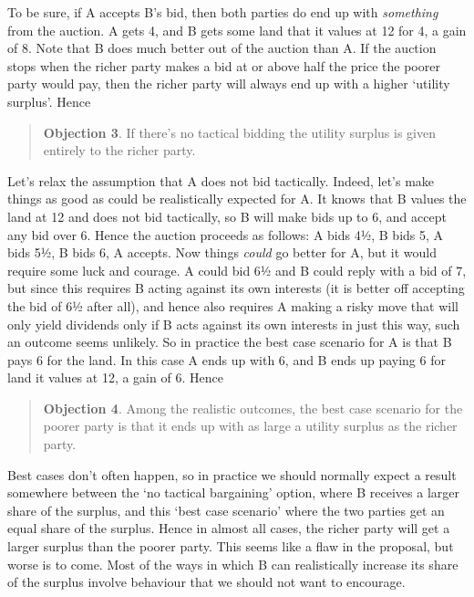 \documentclass[
  10pt,
  letterpaper,
  DIV=11,
  numbers=noendperiod,
  twoside]{scrartcl}
\begin{document}
To be sure, if A accepts B's bid, then both parties do end up with
\emph{something} from the auction. A gets 4, and B gets some land that
it values at 12 for 4, a gain of 8. Note that B does much better out of
the auction than A. If the auction stops when the richer party makes a
bid at or above half the price the poorer party would pay, then the
richer party will always end up with a higher `utility surplus'. Hence

\begin{quote}
\textbf{Objection 3}. If there's no tactical bidding the utility surplus
is given entirely to the richer party.
\end{quote}

Let's relax the assumption that A does not bid tactically. Indeed, let's
make things as good as could be realistically expected for A. It knows
that B values the land at 12 and does not bid tactically, so B will make
bids up to 6, and accept any bid over 6. Hence the auction proceeds as
follows: A bids 4½, B bids 5, A bids 5½, B bids 6, A accepts. Now things
\emph{could} go better for A, but it would require some luck and
courage. A could bid 6½ and B could reply with a bid of 7, but since
this requires B acting against its own interests (it is better off
accepting the bid of 6½ after all), and hence also requires A making a
risky move that will only yield dividends only if B acts against its own
interests in just this way, such an outcome seems unlikely. So in
practice the best case scenario for A is that B pays 6 for the land. In
this case A ends up with 6, and B ends up paying 6 for land it values at
12, a gain of 6. Hence

\begin{quote}
\textbf{Objection 4}. Among the realistic outcomes, the best case
scenario for the poorer party is that it ends up with as large a utility
surplus as the richer party.
\end{quote}

Best cases don't often happen, so in practice we should normally expect
a result somewhere between the `no tactical bargaining' option, where B
receives a larger share of the surplus, and this `best case scenario'
where the two parties get an equal share of the surplus. Hence in almost
all cases, the richer party will get a larger surplus than the poorer
party. This seems like a flaw in the proposal, but worse is to come.
Most of the ways in which B can realistically increase its share of the
surplus involve behaviour that we should not want to encourage.
\end{document}
